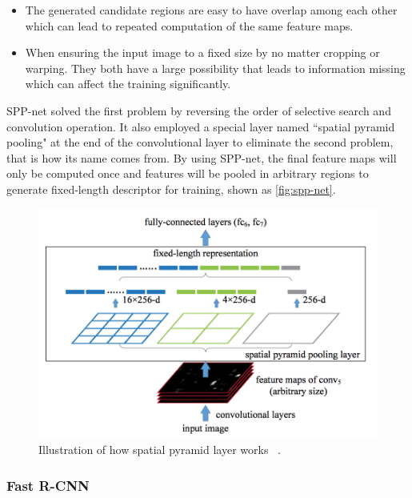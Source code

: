 \begin{itemize}
    \item The generated candidate regions are easy to have overlap among each 
    other which can lead to repeated computation of the same feature maps.

    \item When ensuring the input image to a fixed size by no matter cropping or
    warping. They both have a large possibility that leads to information
    missing which can affect the training significantly.
\end{itemize}

SPP-net solved the first problem by reversing the order of selective search and
convolution operation.
It also employed a special layer named ``spatial pyramid pooling" at the
end of the convolutional layer to eliminate the second problem, that is how its 
name comes from.
By using SPP-net, the final feature maps will only be
computed once and features will be pooled in arbitrary regions to generate 
fixed-length descriptor for training, shown as \autoref{fig:spp-net}.


\begin{figure}
    \begin{center}
    \includegraphics[scale=0.7]{figures/spp_net.png}
    \end{center}
    \caption{Illustration of how spatial pyramid layer works
    ~\protect\cite{spp-net-paper-2014}.}
    \label{fig:spp-net}
\end{figure}


\subsubsection{Fast R-CNN}

